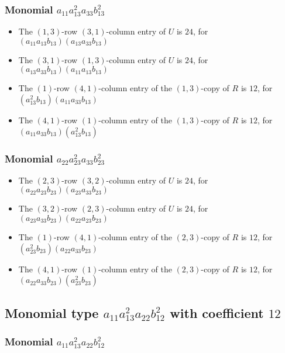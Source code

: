 \documentclass{article}
\begin{document}
\subsubsection{Monomial $ a_{11} a_{13}^{2} a_{33} b_{13}^{2} $}

\begin{itemize}
\item The $ \left(1, 3\right) $-row $ \left(3, 1\right) $-column entry of $U$ is $ 24 $, for $( a_{11} a_{13} b_{13} )( a_{13} a_{33} b_{13} )$ 
\item The $ \left(3, 1\right) $-row $ \left(1, 3\right) $-column entry of $U$ is $ 24 $, for $( a_{13} a_{33} b_{13} )( a_{11} a_{13} b_{13} )$ 
\item The $(1)$-row $(4, 1)$-column entry of the $ \left(1, 3\right) $-copy of $R$ is $ 12 $, for $( a_{13}^{2} b_{13} )( a_{11} a_{33} b_{13} )$ 
\item The $(4, 1)$-row $(1)$-column entry of the $ \left(1, 3\right) $-copy of $R$ is $ 12 $, for $( a_{11} a_{33} b_{13} )( a_{13}^{2} b_{13} )$ 
\end{itemize}
\subsubsection{Monomial $ a_{22} a_{23}^{2} a_{33} b_{23}^{2} $}

\begin{itemize}
\item The $ \left(2, 3\right) $-row $ \left(3, 2\right) $-column entry of $U$ is $ 24 $, for $( a_{22} a_{23} b_{23} )( a_{23} a_{33} b_{23} )$ 
\item The $ \left(3, 2\right) $-row $ \left(2, 3\right) $-column entry of $U$ is $ 24 $, for $( a_{23} a_{33} b_{23} )( a_{22} a_{23} b_{23} )$ 
\item The $(1)$-row $(4, 1)$-column entry of the $ \left(2, 3\right) $-copy of $R$ is $ 12 $, for $( a_{23}^{2} b_{23} )( a_{22} a_{33} b_{23} )$ 
\item The $(4, 1)$-row $(1)$-column entry of the $ \left(2, 3\right) $-copy of $R$ is $ 12 $, for $( a_{22} a_{33} b_{23} )( a_{23}^{2} b_{23} )$ 
\end{itemize}
\subsection{Monomial type $ a_{11} a_{13}^{2} a_{22} b_{12}^{2} $ with coefficient $ 12 $}

\subsubsection{Monomial $ a_{11} a_{13}^{2} a_{22} b_{12}^{2} $}
\end{document}
